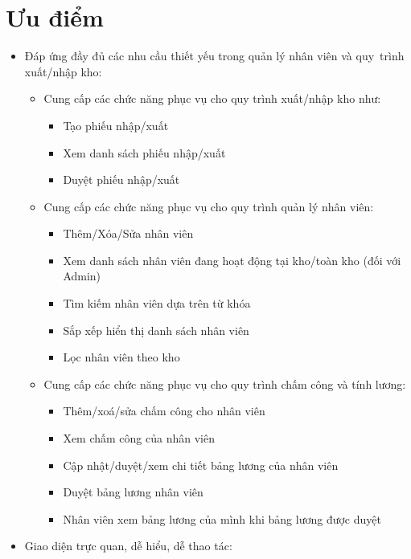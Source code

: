 \documentclass[a4paper,12pt]{report}
\begin{document}
\section{Ưu điểm}
\begin{itemize}
    \item Đáp ứng đầy đủ các nhu cầu thiết yếu trong quản lý nhân viên và quy~trình xuất/nhập kho:
    \begin{itemize}
        \item Cung cấp các chức năng phục vụ cho quy trình xuất/nhập kho như: 
        \begin{itemize}
            \item Tạo phiếu nhập/xuất
            \item Xem danh sách phiếu nhập/xuất
            \item Duyệt phiếu nhập/xuất
        \end{itemize}
        \item Cung cấp các chức năng phục vụ cho quy trình quản lý nhân viên:
        \begin{itemize}
            \item Thêm/Xóa/Sửa nhân viên
            \item Xem danh sách nhân viên đang hoạt động tại kho/toàn kho (đối với Admin)
            \item Tìm kiếm nhân viên dựa trên từ khóa
            \item Sắp xếp hiển thị danh sách nhân viên
            \item Lọc nhân viên theo kho
        \end{itemize}
        \item Cung cấp các chức năng phục vụ cho quy trình chấm công và tính lương:
        \begin{itemize}
            \item Thêm/xoá/sửa chấm công cho nhân viên 
            \item Xem chấm công của nhân viên
            \item Cập nhật/duyệt/xem chi tiết bảng lương của nhân viên
            \item Duyệt bảng lương nhân viên
            \item Nhân viên xem bảng lương của mình khi bảng lương được duyệt
        \end{itemize}
    \end{itemize}
    \item Giao diện trực quan, dễ hiểu, dễ thao tác:
    \begin{itemize}

\end{itemize}
\end{itemize}
\end{document}
